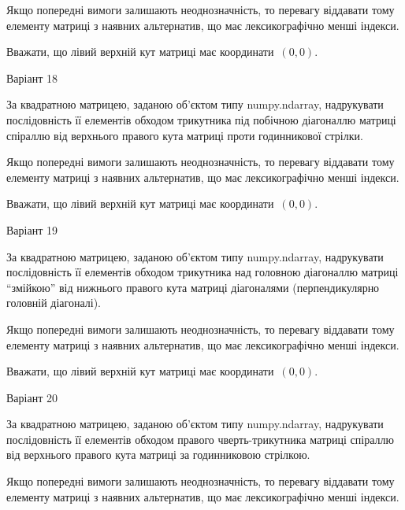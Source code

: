 \documentclass[11pt]{article}
\begin{document}
\vspace{2mm}
Якщо попередні вимоги залишають неоднозначність, то перевагу віддавати тому елементу матриці з наявних альтернатив, що має лексикографічно менші індекси.

Вважати, що лівий верхній кут матриці має координати~$(0,0)$.



{\Large \center  Варіант  18\par \bigskip\bigskip}

За квадратною матрицею, заданою об'єктом типу numpy.ndarray, надрукувати послідовність її елементів обходом трикутника під побічною діагоналлю матриці спіраллю від верхнього правого кута матриці проти годинникової стрілки.

\vspace{2mm}
Якщо попередні вимоги залишають неоднозначність, то перевагу віддавати тому елементу матриці з наявних альтернатив, що має лексикографічно менші індекси.

Вважати, що лівий верхній кут матриці має координати~$(0,0)$.



{\Large \center  Варіант  19\par \bigskip\bigskip}

За квадратною матрицею, заданою об'єктом типу numpy.ndarray, надрукувати послідовність її елементів обходом трикутника над головною діагоналлю матриці ``змійкою'' від нижнього правого кута матриці діагоналями (перпендикулярно головній діагоналі).

\vspace{2mm}
Якщо попередні вимоги залишають неоднозначність, то перевагу віддавати тому елементу матриці з наявних альтернатив, що має лексикографічно менші індекси.

Вважати, що лівий верхній кут матриці має координати~$(0,0)$.



{\Large \center  Варіант  20\par \bigskip\bigskip}

За квадратною матрицею, заданою об'єктом типу numpy.ndarray, надрукувати послідовність її елементів обходом правого чверть-трикутника матриці спіраллю від верхнього правого кута матриці за годинниковою стрілкою.

\vspace{2mm}
Якщо попередні вимоги залишають неоднозначність, то перевагу віддавати тому елементу матриці з наявних альтернатив, що має лексикографічно менші індекси.
\end{document}
